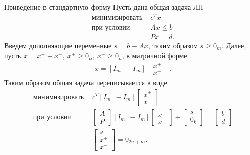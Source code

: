 \documentclass[10pt]{beamer}
\begin{document}
\begin{frame}{Приведение в стандартную форму}
Пусть дана общая задача ЛП
$$
\begin{array}{ll}
\mbox{минимизировать } & c^Tx \\ 
\mbox{при условии }    & Ax\leq b\\
& Px=d.
\end{array}
$$
Введем дополняющие переменные $s=b-Ax$, таким образом $s\geq 0_m$. Далее, пусть $x=x^+-x^-,~x^+\geq 0_n,~x^-\geq 0_n$, в матричной форме
$$
x=[I_m~~-I_m]\left[\begin{array}{ll}
x^+ \\ x^-\end{array}\right].
$$
Таким образом общая задача переписывается в виде
$$
\begin{array}{ll}
\mbox{минимизировать } & c^T [I_m~~-I_m]\left[\begin{array}{ll}
x^+ \\ x^-\end{array}\right] \\ 
\mbox{при условии } & \left[
\begin{array}{ll} A \\ P \end{array}\right][I_m~~-I_m]\left[\begin{array}{ll}
x^+ \\ x^-\end{array}\right] + \left[\begin{array}{ll}
s \\ 0_k
\end{array}\right] = \left[\begin{array}{ll}
b \\ d
\end{array}\right] \\
& \left[\begin{array}{ll}
s \\ x^+ \\ x^-
\end{array}\right]=0_{2n+m}.
\end{array}
$$\end{frame}
\end{document}
